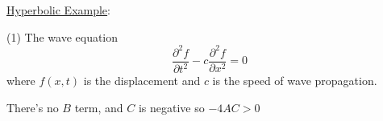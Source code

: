 \documentclass[12pt]{article}
\newcommand{\Macro}{\ensuremath{\Sigma}}
\begin{document}

\vspace*{1em}
\noindent \underline{Hyperbolic Example}:

(1) The wave equation
%
\begin{equation}
\frac{\partial^2 f}{\partial t^2} - c \frac{\partial^2 f}{\partial x^2} = 0
\end{equation}
%
where $f(x,t)$ is the displacement and $c$ is the speed of wave propagation.

\noindent There's no $B$ term, and $C$ is negative so $-4AC > 0$

%
%


\end{document}
